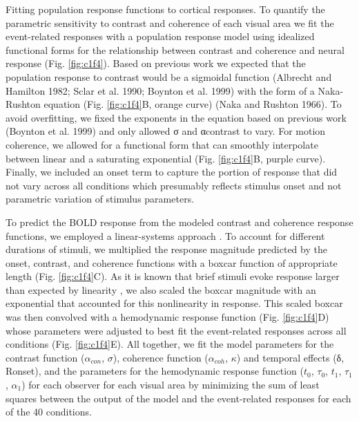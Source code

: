 \documentclass{report}
\begin{document}
Fitting population response functions to cortical responses.
To quantify the parametric sensitivity to contrast and coherence of each visual area we fit the event-related responses with a population response model using idealized functional forms for the relationship between contrast and coherence and neural response (Fig. \ref{fig:c1f4}). Based on previous work we expected that the population response to contrast would be a sigmoidal function (Albrecht and Hamilton 1982; Sclar et al. 1990; Boynton et al. 1999) with the form of a Naka-Rushton equation (Fig. \ref{fig:c1f4}B, orange curve) (Naka and Rushton 1966). To avoid overfitting, we fixed the exponents in the equation based on previous work (Boynton et al. 1999) and only allowed σ and αcontrast to vary. For motion coherence, we allowed for a functional form that can smoothly interpolate between linear \citep{Britten1992-xy,Britten1993-oh,Simoncelli1998-ts,Rees2000-ul} and a saturating exponential (Fig. \ref{fig:c1f4}B, purple curve). Finally, we included an onset term to capture the portion of response that did not vary across all conditions which presumably reflects stimulus onset and not parametric variation of stimulus parameters.

To predict the BOLD response from the modeled contrast and coherence response functions, we employed a linear-systems approach \citep{Heeger2000-pq,Rees2000-ul,Logothetis2001-kk}. To account for different durations of stimuli, we multiplied the response magnitude predicted by the onset, contrast, and coherence functions with a boxcar function of appropriate length (Fig. \ref{fig:c1f4}C). As it is known that brief stimuli evoke response larger than expected by linearity \citep{Boynton1996-ff,Boynton2012-xy}, we also scaled the boxcar magnitude with an exponential that accounted for this nonlinearity in response. This scaled boxcar was then convolved with a hemodynamic response function (Fig. \ref{fig:c1f4}D) whose parameters were adjusted to best fit the event-related responses across all conditions (Fig. \ref{fig:c1f4}E). All together, we fit the model parameters for the contrast function ($\alpha_{con}$, $\sigma$), coherence function ($\alpha_{coh}$, $\kappa$) and temporal effects (δ, Ronset), and the parameters for the hemodynamic response function ($t_0$, $\tau_0$, $t_1$, $\tau_1$, $\alpha_1$) for each observer for each visual area by minimizing the sum of least squares between the output of the model and the event-related responses for each of the 40 conditions.
\end{document}
